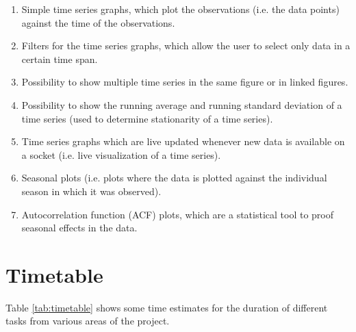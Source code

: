 \documentclass[12pt, a4paper]{article}
\begin{document}
\begin{enumerate}
 \item Simple time series graphs, which plot the observations (i.e. the data points) against the time of the observations.
 \item Filters for the time series graphs, which allow the user to select only data in a certain time span.
 \item Possibility to show multiple time series in the same figure or in linked figures.
 \item Possibility to show the running average and running standard deviation of a time series (used to determine stationarity of a time series).
 \item Time series graphs which are live updated whenever new data is available on a socket (i.e. live visualization of a time series).
 \item Seasonal plots (i.e. plots where the data is plotted against the individual season in which it was observed).
 \item Autocorrelation function (ACF) plots, which are a statistical tool to proof seasonal effects in the data.
\end{enumerate}



\section{Timetable}

Table \ref{tab:timetable} shows some time estimates for the duration of different tasks from various areas of the project. 
\end{document}
